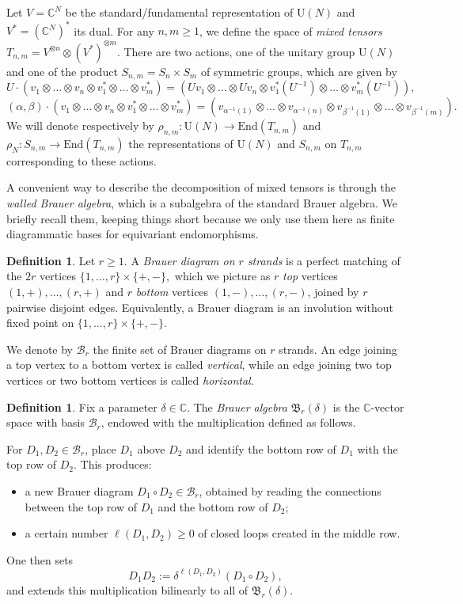 \documentclass[11pt,a4paper,reqno]{article}
\theoremstyle{definition}
\newtheorem{definition}[theorem]{Definition}
\theoremstyle{remark}
\newcommand\U{{\mathrm U}}
\newcommand\C{\mathbb{C}}
\newcommand\End{{\mathrm{End}}}
\newcommand\Br{{\mathfrak{B}}}
\begin{document}
Let $V=\C^N$ be the standard/fundamental representation of $\U(N)$ and $V^*=(\C^N)^*$ its dual. For any $n,m\geq 1$, we define the space of \emph{mixed tensors} $T_{n,m}=V^{\otimes n}\otimes {(V^*)}^{\otimes m}$. There are two actions, one of the unitary group $\U(N)$ and one of the product $S_{n,m}=S_n\times S_m$ of symmetric groups, which are given by
\[
U\cdot(v_1\otimes \ldots\otimes v_n\otimes v_1^*\otimes\ldots\otimes v_m^*)=(Uv_1\otimes\ldots\otimes Uv_n\otimes v_1^*(U^{-1})\otimes\ldots\otimes v_m^*(U^{-1})),
\]
\[
(\alpha,\beta)\cdot(v_1\otimes \ldots\otimes v_n\otimes v_1^*\otimes\ldots\otimes v_m^*)=(v_{\alpha^{-1}(1)}\otimes\ldots\otimes v_{\alpha^{-1}(n)}\otimes v_{\beta^{-1}(1)}\otimes\ldots\otimes v_{\beta^{-1}(m)}).
\]
We will denote respectively by $\rho_{n,m}:\U(N)\to\End(T_{n,m})$ and $\rho_N:S_{n,m}\to\End(T_{n,m})$ the representations of $\U(N)$ and $S_{n,m}$ on $T_{n,m}$ corresponding to these actions.

A convenient way to describe the decomposition of mixed tensors is through the \emph{walled Brauer algebra}, which is a subalgebra of the standard Brauer algebra. We briefly recall them, keeping things short because we only use them here as finite diagrammatic bases for equivariant endomorphisms.

\begin{definition}
Let $r\ge 1$. A \emph{Brauer diagram on $r$ strands} is a perfect matching of the $2r$ vertices $\{1,\dots,r\}\times\{+,-\},$ which we picture as $r$ \emph{top} vertices $(1,+),\dots,(r,+)$ and $r$ \emph{bottom} vertices $(1,-),\dots,(r,-)$, joined by $r$ pairwise disjoint edges. Equivalently, a Brauer diagram is an involution without fixed point on $\{1,\dots,r\}\times\{+,-\}$.

We denote by $\mathcal B_r$ the finite set of Brauer diagrams on $r$ strands. An edge joining a top vertex to a bottom vertex is called \emph{vertical}, while an edge joining two top vertices or two bottom vertices is called \emph{horizontal}.
\end{definition}

\begin{definition}
Fix a parameter $\delta\in\C$. The \emph{Brauer algebra} $\Br_r(\delta)$ is the $\C$-vector space with basis $\mathcal B_r$, endowed with the multiplication defined as follows.

For $D_1,D_2\in\mathcal B_r$, place $D_1$ above $D_2$ and identify the bottom row of $D_1$ with the top row of $D_2$. This produces:
\begin{itemize}
\item a new Brauer diagram $D_1\circ D_2\in\mathcal B_r$, obtained by reading the connections between the top row of $D_1$ and the bottom row of $D_2$;
\item a certain number $\ell(D_1,D_2)\ge 0$ of closed loops created in the middle row.
\end{itemize}
One then sets
\[
D_1D_2:=\delta^{\ell(D_1,D_2)}(D_1\circ D_2),
\]
and extends this multiplication bilinearly to all of $\Br_r(\delta)$.
\end{definition}
\end{document}
